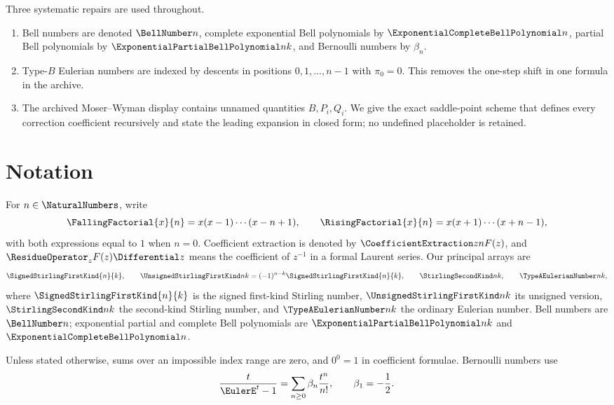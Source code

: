 \documentclass[11pt,a4paper,oneside,openany]{book}
\theoremstyle{definition}
\theoremstyle{remark}
\begin{document}
\begin{auditbox}
Three systematic repairs are used throughout.
\begin{enumerate}
\item Bell numbers are denoted $\BellNumber n$, complete exponential Bell polynomials by
      $\ExponentialCompleteBellPolynomial n$, partial Bell polynomials by $\ExponentialPartialBellPolynomial nk$, and Bernoulli numbers by
      $\beta_n$.
\item Type-$B$ Eulerian numbers are indexed by descents in positions
      $0,1,\ldots,n-1$ with $\pi_0=0$.  This removes the one-step shift in one formula
      in the archive.
\item The archived Moser--Wyman display contains unnamed quantities
      $B,P_i,Q_i$.  We give the exact saddle-point scheme that defines every
      correction coefficient recursively and state the leading expansion in closed
      form; no undefined placeholder is retained.
\end{enumerate}
\end{auditbox}

\tableofcontents

\chapter*{Notation}
For $n\in\NaturalNumbers$, write
\[
 \FallingFactorial{x}{n}=x(x-1)\cdots(x-n+1),\qquad
 \RisingFactorial{x}{n}=x(x+1)\cdots(x+n-1),
\]
with both expressions equal to $1$ when $n=0$.  Coefficient extraction is denoted by
$\CoefficientExtraction z n F(z)$, and $\ResidueOperator_z F(z)\Differential z$ means the coefficient of $z^{-1}$ in a
formal Laurent series.  Our principal arrays are
\[
 \SignedStirlingFirstKind{n}{k},\qquad \UnsignedStirlingFirstKind nk=(-1)^{n-k}\SignedStirlingFirstKind{n}{k},\qquad
 \StirlingSecondKind nk,\qquad \TypeAEulerianNumber nk,
\]
where $\SignedStirlingFirstKind{n}{k}$ is the signed first-kind Stirling number, $\UnsignedStirlingFirstKind nk$ its unsigned
version, $\StirlingSecondKind nk$ the second-kind Stirling number, and $\TypeAEulerianNumber nk$ the
ordinary Eulerian number.  Bell numbers are $\BellNumber n$; exponential partial and
complete Bell polynomials are $\ExponentialPartialBellPolynomial nk$ and $\ExponentialCompleteBellPolynomial n$.

Unless stated otherwise, sums over an impossible index range are zero, and
$0^0=1$ in coefficient formulae.  Bernoulli numbers use
\[
 \frac{t}{\EulerE^t-1}=\sum_{n\ge0}\beta_n\frac{t^n}{n!},
 \qquad \beta_1=-\frac12.
\]
\end{document}
